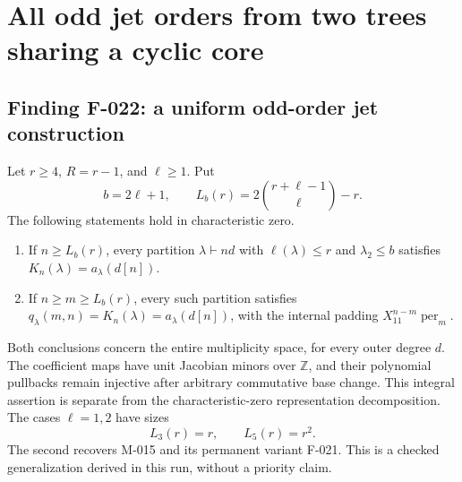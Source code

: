 \section{All odd jet orders from two trees sharing a cyclic core}

\subsection*{Finding F-022: a uniform odd-order jet construction}
Let \(r\geq4\), \(R=r-1\), and \(\ell\geq1\). Put
\[
 b=2\ell+1,\qquad
 L_b(r)=2\binom{r+\ell-1}{\ell}-r.
                                                               \tag{F-022.1}
\]
The following statements hold in characteristic zero.
\begin{enumerate}
\item If \(n\geq L_b(r)\), every partition \(\lambda\vdash nd\)
with \(\ell(\lambda)\leq r\) and \(\lambda_2\leq b\)
satisfies \(K_n(\lambda)=a_\lambda(d[n])\).
\item If \(n\geq m\geq L_b(r)\), every such partition satisfies
\(q_\lambda(m,n)=K_n(\lambda)=a_\lambda(d[n])\), with
the internal padding \(X_{11}^{n-m}\operatorname{per}_m\).
\end{enumerate}
Both conclusions concern the entire multiplicity space, for
every outer degree \(d\). The coefficient maps have unit
Jacobian minors over \(\mathbb Z\), and their polynomial
pullbacks remain injective after arbitrary commutative base
change. This integral assertion is separate from the
characteristic-zero representation decomposition.
The cases \(\ell=1,2\) have sizes
\[
                         L_3(r)=r,\qquad L_5(r)=r^2.
                                                               \tag{F-022.2}
\]
The second recovers M-015 and its permanent variant F-021.
This is a checked generalization derived in this run, without
a priority claim.

